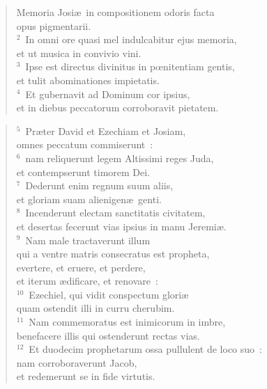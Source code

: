 \begin{flushleft}\begin{verse}\vspace{-19pt}\hspace{6pt}Memoria Josi\ae\ in compositionem odoris facta\\\hspace{6pt} opus pigmentarii.\\
${}^{2}$~In omni ore quasi mel indulcabitur ejus memoria,\\ et ut musica in convivio vini.\\
${}^{3}$~Ipse est directus divinitus in pœnitentiam gentis,\\ et tulit abominationes impietatis.\\
${}^{4}$~Et gubernavit ad Dominum cor ipsius,\\ et in diebus peccatorum corroboravit pietatem.\end{verse}\end{flushleft}


\begin{flushleft}\begin{verse}${}^{5}$~Pr\ae ter David et Ezechiam et Josiam,\\ omnes peccatum commiserunt~:\\
${}^{6}$~nam reliquerunt legem Altissimi reges Juda,\\ et contempserunt timorem Dei.\\
${}^{7}$~Dederunt enim regnum suum aliis,\\ et gloriam suam alienigen\ae\ genti.\\
${}^{8}$~Incenderunt electam sanctitatis civitatem,\\ et desertas fecerunt vias ipsius in manu Jeremi\ae .\\
${}^{9}$~Nam male tractaverunt illum\\ qui a ventre matris consecratus est propheta,\\ evertere, et eruere, et perdere,\\ et iterum \ae dificare, et renovare~:\\
${}^{10}$~Ezechiel, qui vidit conspectum glori\ae \\ quam ostendit illi in curru cherubim.\\
${}^{11}$~Nam commemoratus est inimicorum in imbre,\\ benefacere illis qui ostenderunt rectas vias.\\
${}^{12}$~Et duodecim prophetarum ossa pullulent de loco suo~:\\ nam corroboraverunt Jacob,\\ et redemerunt se in fide virtutis.\end{verse}\end{flushleft}


